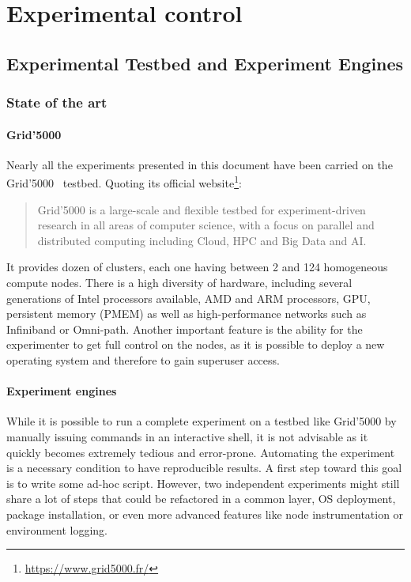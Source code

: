 \part{Experimental control}
\label{part:experiment}

\chapter{Experimental Testbed and Experiment Engines}%
\label{chapter:experiment:testbed}

    \section{State of the art}%
    \label{sec:state_of_the_art}

        \subsection{Grid'5000}%
        \label{sub:grid_5000}

            Nearly all the experiments presented in this document have been carried on the Grid'5000~\cite{grid5000}
            testbed.  Quoting its official website\footnote{\url{https://www.grid5000.fr/}}: \blockquote{Grid'5000 is a
            large-scale and flexible testbed for experiment-driven research in all areas of computer science, with a
            focus on parallel and distributed computing including Cloud, HPC and Big Data and AI.} It provides dozen of
            clusters, each one having between 2 and 124 homogeneous compute nodes. There is a high diversity of hardware,
            including several generations of Intel processors available, AMD and ARM processors, GPU, persistent memory
            (PMEM) as well as high-performance networks such as Infiniband or Omni-path. Another important feature is the
            ability for the experimenter to get full control on the nodes, as it is possible to deploy a new operating
            system and therefore to gain superuser access.

        \subsection{Experiment engines}%
        \label{sub:experiment_engines}

            While it is possible to run a complete experiment on a testbed like Grid'5000 by manually issuing commands
            in an interactive shell, it is not advisable as it quickly becomes extremely tedious and error-prone.
            Automating the experiment is a necessary condition to have reproducible results. A first step toward this
            goal is to write some ad-hoc script. However, two independent experiments might still share a lot of steps
            that could be refactored in a common layer, \eg OS deployment, package installation, or even more advanced
            features like node instrumentation or environment logging.

